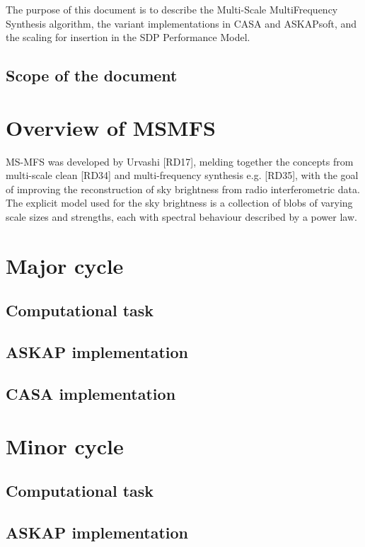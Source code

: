 \documentclass[11pt,a4paper]{article}
\begin{document}
The purpose of this document is to describe the Multi-Scale MultiFrequency Synthesis algorithm, the variant implementations in CASA and ASKAPsoft, and the scaling for insertion in the SDP Performance Model.

\subsection{Scope of the document}

\clearpage
\section{Overview of MSMFS}
\label{sec:overview}

MS-MFS was developed by Urvashi [RD17], melding together the concepts from multi-scale clean [RD34] and multi-frequency synthesis e.g. [RD35], with the goal of improving the reconstruction of sky brightness from radio interferometric data. The explicit model used for the sky brightness is a collection of blobs of varying scale sizes and strengths, each with spectral behaviour described by a power law.

\clearpage
\section{Major cycle}
\label{sec:major}
\subsection{Computational task}

\subsection{ASKAP implementation}

\subsection{CASA implementation}

\clearpage
\section{Minor cycle}
\label{sec:minor}

\subsection{Computational task}

\subsection{ASKAP implementation}
\end{document}
